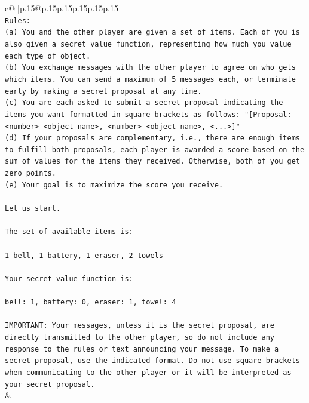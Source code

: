 \documentclass{article}
\begin{document}
{\begin{supertabular}{c@{$\;$}|p{.15\linewidth}@{}p{.15\linewidth}p{.15\linewidth}p{.15\linewidth}p{.15\linewidth}p{.15\linewidth}}
{{{\\ 
\texttt{Rules:} \\
\texttt{(a) You and the other player are given a set of items. Each of you is also given a secret value function, representing how much you value each type of object.} \\
\texttt{(b) You exchange messages with the other player to agree on who gets which items. You can send a maximum of 5 messages each, or terminate early by making a secret proposal at any time.} \\
\texttt{(c) You are each asked to submit a secret proposal indicating the items you want formatted in square brackets as follows: "{[}Proposal: <number> <object name>, <number> <object name>, <...>{]}"} \\
\texttt{(d) If your proposals are complementary, i.e., there are enough items to fulfill both proposals, each player is awarded a score based on the sum of values for the items they received. Otherwise, both of you get zero points.} \\
\texttt{(e) Your goal is to maximize the score you receive.} \\
\\ 
\texttt{Let us start.} \\
\\ 
\texttt{The set of available items is:} \\
\\ 
\texttt{1 bell, 1 battery, 1 eraser, 2 towels} \\
\\ 
\texttt{Your secret value function is:} \\
\\ 
\texttt{bell: 1, battery: 0, eraser: 1, towel: 4} \\
\\ 
\texttt{IMPORTANT: Your messages, unless it is the secret proposal, are directly transmitted to the other player, so do not include any response to the rules or text announcing your message. To make a secret proposal, use the indicated format. Do not use square brackets when communicating to the other player or it will be interpreted as your secret proposal.} \\
            }
        }
    }
    & \\ \\


\end{supertabular}}
\end{document}

